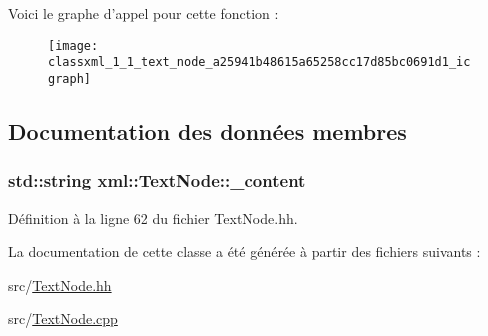 Voici le graphe d'appel pour cette fonction :\nopagebreak
\begin{figure}[H]
\begin{center}
\leavevmode
\texttt{[image: classxml\_1\_1\_text\_node\_a25941b48615a65258cc17d85bc0691d1\_icgraph]}
\end{center}
\end{figure}




\subsection{Documentation des données membres}
\hypertarget{classxml_1_1_text_node_a1c237e716b3f9fd76569d443d838cd25}{
\subsubsection[{\_\-content}]{\setlength{\rightskip}{0pt plus 5cm}std::string {\bf xml::TextNode::\_\-content}}}
\label{classxml_1_1_text_node_a1c237e716b3f9fd76569d443d838cd25}


Définition à la ligne 62 du fichier TextNode.hh.



La documentation de cette classe a été générée à partir des fichiers suivants :\begin{DoxyCompactItemize}
\item 
src/\hyperlink{_text_node_8hh}{TextNode.hh}\item 
src/\hyperlink{_text_node_8cpp}{TextNode.cpp}\end{DoxyCompactItemize}

